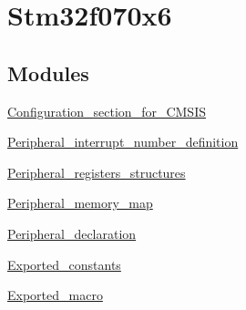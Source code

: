 \hypertarget{group__stm32f070x6}{}\section{Stm32f070x6}
\label{group__stm32f070x6}
\subsection*{Modules}
\begin{DoxyCompactItemize}
\item 
\hyperlink{group___configuration__section__for___c_m_s_i_s}{Configuration\+\_\+section\+\_\+for\+\_\+\+C\+M\+S\+IS}
\item 
\hyperlink{group___peripheral__interrupt__number__definition}{Peripheral\+\_\+interrupt\+\_\+number\+\_\+definition}
\item 
\hyperlink{group___peripheral__registers__structures}{Peripheral\+\_\+registers\+\_\+structures}
\item 
\hyperlink{group___peripheral__memory__map}{Peripheral\+\_\+memory\+\_\+map}
\item 
\hyperlink{group___peripheral__declaration}{Peripheral\+\_\+declaration}
\item 
\hyperlink{group___exported__constants}{Exported\+\_\+constants}
\item 
\hyperlink{group___exported__macro}{Exported\+\_\+macro}
\end{DoxyCompactItemize}
